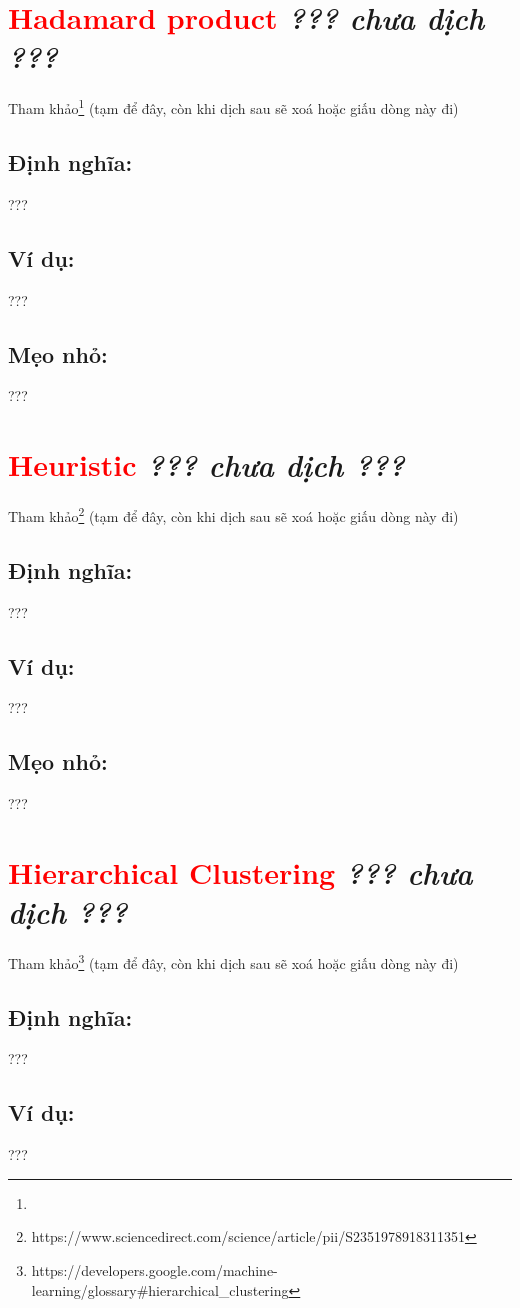 \section*{\huge \textcolor{Red}{Hadamard product}  \small \textit{??? chưa dịch ???} }
Tham khảo\footnote{} (tạm để đây, còn khi dịch sau sẽ xoá hoặc giấu dòng này đi)
\subsection*{Định nghĩa:}
???
\subsection*{Ví dụ:}
???
\subsection*{Mẹo nhỏ:}
???
\section*{\huge \textcolor{Red}{Heuristic}  \small \textit{??? chưa dịch ???} }
Tham khảo\footnote{https://www.sciencedirect.com/science/article/pii/S2351978918311351} (tạm để đây, còn khi dịch sau sẽ xoá hoặc giấu dòng này đi)
\subsection*{Định nghĩa:}
???
\subsection*{Ví dụ:}
???
\subsection*{Mẹo nhỏ:}
???
\section*{\huge \textcolor{Red}{Hierarchical Clustering}  \small \textit{??? chưa dịch ???} }
Tham khảo\footnote{https://developers.google.com/machine-learning/glossary\#hierarchical{\_}clustering} (tạm để đây, còn khi dịch sau sẽ xoá hoặc giấu dòng này đi)
\subsection*{Định nghĩa:}
???
\subsection*{Ví dụ:}
???
